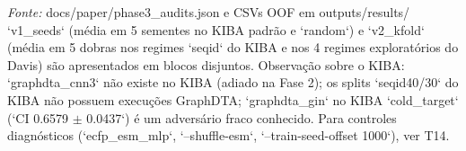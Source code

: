 \begin{table}[htbp]
\begin{tabular}{llllllllllllllll}
\bottomrule
\end{tabular}
\begin{flushleft}
\footnotesize \textit{Fonte:} docs/paper/phase3\_audits.json e CSVs OOF em outputs/results/ `v1\_seeds` (média em 5 sementes no KIBA padrão e `random`) e `v2\_kfold` (média em 5 dobras nos regimes `seqid` do KIBA e nos 4 regimes exploratórios do Davis) são apresentados em blocos disjuntos. Observação sobre o KIBA: `graphdta\_cnn3` não existe no KIBA (adiado na Fase 2); os splits `seqid40/30` do KIBA não possuem execuções GraphDTA; `graphdta\_gin` no KIBA `cold\_target` (`CI 0.6579 $\pm$ 0.0437`) é um adversário fraco conhecido. Para controles diagnósticos (`ecfp\_esm\_mlp`, `--shuffle-esm`, `--train-seed-offset 1000`), ver T14.
\end{flushleft}
\end{table}
